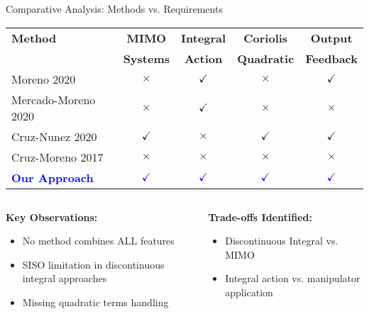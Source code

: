 \begin{frame}{Comparative Analysis: Methods vs. Requirements}
  \begin{table}
    \centering
    \footnotesize
    \begin{tabular}{|l|c|c|c|c|}
    \hline
    \textbf{Method} & \textbf{MIMO} & \textbf{Integral} & \textbf{Coriolis} & \textbf{Output} \\
    & \textbf{Systems} & \textbf{Action} & \textbf{Quadratic} & \textbf{Feedback} \\
    \hline
    Moreno 2020 & $\times$ & $\checkmark$ & $\times$ & $\checkmark$ \\
    \hline
    Mercado-Moreno 2020 & $\times$ & $\checkmark$ & $\times$ & $\times$ \\
    \hline
    Cruz-Nunez 2020 & $\checkmark$ & $\times$ & $\checkmark$ & $\checkmark$ \\
    \hline
    Cruz-Moreno 2017 & $\times$ & $\times$ & $\times$ & $\times$ \\
    \hline
    \textcolor{blue}{\textbf{Our Approach}} & \textcolor{blue}{$\checkmark$} & \textcolor{blue}{$\checkmark$} & \textcolor{blue}{$\checkmark$} & \textcolor{blue}{$\checkmark$} \\
    \hline
    \end{tabular}
  \end{table}

  \vspace{0.3cm}

  \begin{columns}
    \begin{column}{0.5\textwidth}
      \textbf{Key Observations:}
      \begin{itemize}
        \item No method combines ALL features
        \item SISO limitation in discontinuous integral approaches
        \item Missing quadratic terms handling
      \end{itemize}
    \end{column}
    
    \begin{column}{0.5\textwidth}
      \textbf{Trade-offs Identified:}
      \begin{itemize}
        \item Discontinuous Integral vs. MIMO
        \item Integral action vs. manipulator application
      \end{itemize}
    \end{column}
  \end{columns}
\end{frame}

